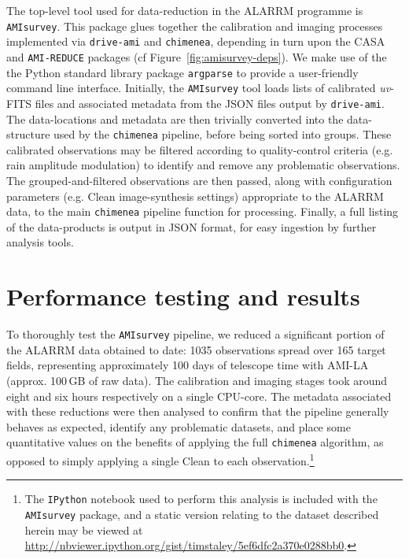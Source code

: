 \documentclass[5p,authoryear]{elsarticle}
\begin{document}
The top-level tool used for data-reduction in the ALARRM programme is \texttt{AMIsurvey}. 
This package glues together the calibration and imaging processes implemented via \texttt{drive-ami} and \texttt{chimenea}, depending in turn upon the CASA and \texttt{AMI-REDUCE} packages (cf Figure~\ref{fig:amisurvey-deps}). 
We make use of the the Python standard library package \texttt{argparse} to provide a user-friendly command line interface.
Initially, the \texttt{AMIsurvey} tool loads lists of calibrated \textit{uv}-FITS files and associated metadata from the JSON files output by \texttt{drive-ami}. 
The data-locations and metadata are then trivially converted into the data-structure used by the \texttt{chimenea} pipeline, before being sorted into groups. 
These calibrated observations may be filtered according to quality-control criteria (e.g. rain amplitude modulation) to identify and remove any problematic observations.
The grouped-and-filtered observations are then passed, along with configuration parameters (e.g. Clean image-synthesis settings) appropriate to the ALARRM data, to the main \texttt{chimenea} pipeline function for processing. 
Finally, a full listing of the data-products is output in JSON format, for easy ingestion by further analysis tools. 

\section{Performance testing and results}
\label{sec:results}
To thoroughly test the \texttt{AMIsurvey} pipeline, we reduced a significant portion of the ALARRM data obtained to date: 1035 observations spread over 165 target fields, representing approximately 100 days of telescope time with AMI-LA (approx. 100\,GB of raw data). 
The calibration and imaging stages took around eight and six hours respectively on a single CPU-core. 
The metadata associated with these reductions were then analysed to confirm that the pipeline generally behaves as expected, identify any problematic datasets, and place some quantitative values on the benefits of applying the full \texttt{chimenea} algorithm, as opposed to simply applying a single Clean to each observation.\footnote{%
 The \texttt{IPython} notebook used to perform this analysis is included with the \texttt{AMIsurvey} package, and a static version relating to the dataset described herein may be viewed at  \url{http://nbviewer.ipython.org/gist/timstaley/5ef6dfc2a370e0288bb0}.
}
\end{document}
